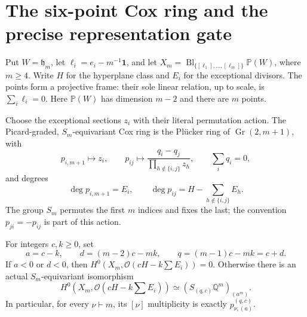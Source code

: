 \section{The six-point Cox ring and the precise representation gate}
\label{sec:cox-six-dictionary}

Put $W=\mathfrak h_m$, let
$\ell_i=e_i-m^{-1}\mathbf1$, and let
$X_m=\operatorname{Bl}_{\{[\ell_1],\ldots,[\ell_m]\}}\mathbb P(W)$,
where $m\ge4$.  Write $H$ for the hyperplane class and $E_i$ for
the exceptional divisors.  The points form a projective frame:
their sole linear relation, up to scale, is $\sum_i\ell_i=0$.
Here $\mathbb P(W)$ has dimension $m-2$ and there are $m$ points.

\begin{proposition}
Choose the exceptional sections $z_i$ with their literal
permutation action.  The Picard-graded, $S_m$-equivariant Cox
ring is the Pl\"ucker ring of $\operatorname{Gr}(2,m+1)$, with
\[
 p_{i,m+1}\longmapsto z_i,
 \qquad
 p_{ij}\longmapsto
 \frac{q_i-q_j}{\prod_{h\notin\{i,j\}}z_h},
 \qquad \sum_iq_i=0,
 \tag{PNEW-C1}
\]
and degrees
\[
 \deg p_{i,m+1}=E_i,
 \qquad \deg p_{ij}=H-\sum_{h\notin\{i,j\}}E_h.
 \tag{PNEW-C2}
\]
The group $S_m$ permutes the first $m$ indices and fixes the
last; the convention $p_{ji}=-p_{ij}$ is part of this action.

For integers $c,k\ge0$, set
\[
 a=c-k,\qquad d=(m-2)c-mk,\qquad q=(m-1)c-mk=c+d.
 \tag{PNEW-C3}
\]
If $a<0$ or $d<0$, then
$H^0(X_m,\mathcal O(cH-k\sum E_i))=0$.
Otherwise there is an actual $S_m$-equivariant isomorphism
\[
 H^0\!\left(X_m,\mathcal O(cH-k\sum E_i)\right)
 \simeq
 \left(S_{(q,c)}\mathbb Q^m\right)_{(a^m)}.
 \tag{PNEW-C4}
\]
In particular, for every $\nu\vdash m$, its $[\nu]$ multiplicity
is exactly $p_{\nu,(a)}^{(q,c)}$.
\end{proposition}
